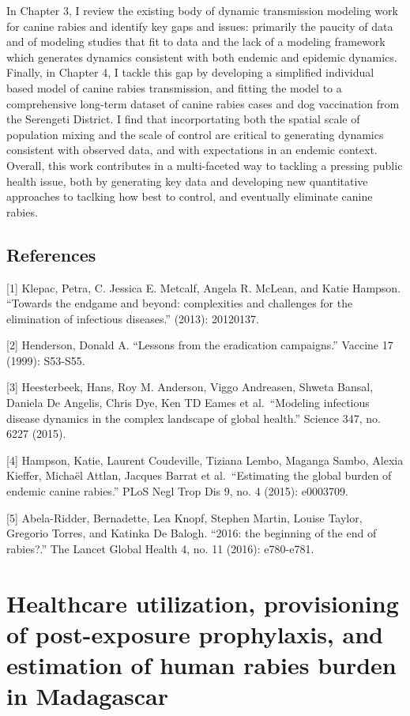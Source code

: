 \documentclass[
]{book}
\begin{document}
In Chapter 3, I review the existing body of dynamic transmission modeling work for canine rabies and identify key gaps and issues: primarily the paucity of data and of modeling studies that fit to data and the lack of a modeling framework which generates dynamics consistent with both endemic and epidemic dynamics. Finally, in Chapter 4, I tackle this gap by developing a simplified individual based model of canine rabies transmission, and fitting the model to a comprehensive long-term dataset of canine rabies cases and dog vaccination from the Serengeti District. I find that incorportating both the spatial scale of population mixing and the scale of control are critical to generating dynamics consistent with observed data, and with expectations in an endemic context. Overall, this work contributes in a multi-faceted way to tackling a pressing public health issue, both by generating key data and developing new quantitative approaches to taclking how best to control, and eventually eliminate canine rabies.

\hypertarget{references}{%
\section*{References}\label{references}}

{[}1{]} Klepac, Petra, C. Jessica E. Metcalf, Angela R. McLean, and Katie Hampson. ``Towards the endgame and beyond: complexities and challenges for the elimination of infectious diseases.'' (2013): 20120137.

{[}2{]} Henderson, Donald A. ``Lessons from the eradication campaigns.'' Vaccine 17 (1999): S53-S55.

{[}3{]} Heesterbeek, Hans, Roy M. Anderson, Viggo Andreasen, Shweta Bansal, Daniela De Angelis, Chris Dye, Ken TD Eames et al.~``Modeling infectious disease dynamics in the complex landscape of global health.'' Science 347, no. 6227 (2015).

{[}4{]} Hampson, Katie, Laurent Coudeville, Tiziana Lembo, Maganga Sambo, Alexia Kieffer, Michaël Attlan, Jacques Barrat et al.~``Estimating the global burden of endemic canine rabies.'' PLoS Negl Trop Dis 9, no. 4 (2015): e0003709.

{[}5{]} Abela-Ridder, Bernadette, Lea Knopf, Stephen Martin, Louise Taylor, Gregorio Torres, and Katinka De Balogh. ``2016: the beginning of the end of rabies?.'' The Lancet Global Health 4, no. 11 (2016): e780-e781.

\hypertarget{healthcare-utilization-provisioning-of-post-exposure-prophylaxis-and-estimation-of-human-rabies-burden-in-madagascar}{%
\chapter{Healthcare utilization, provisioning of post-exposure prophylaxis, and estimation of human rabies burden in Madagascar}\label{healthcare-utilization-provisioning-of-post-exposure-prophylaxis-and-estimation-of-human-rabies-burden-in-madagascar}}
\end{document}
